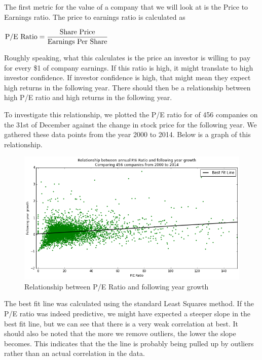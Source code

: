 \documentclass{report}
\begin{document}
The first metric for the value of a company that we will look at is the Price to Earnings ratio. The price to earnings ratio is calculated as

\begin{math}
  \\
	\text{P/E Ratio} = \dfrac{\text{Share Price}}{\text{Earnings Per Share}}
	\\
\end{math}

Roughly speaking, what this calculates is the price an investor is willing to pay for every \$1 of company earnings. If this ratio is high, it might translate to high investor confidence. If investor confidence is high, that might mean they expect high returns in the following year. There should then be a relationship between high P/E ratio and high returns in the following year.

To investigate this relationship, we plotted the P/E ratio for of 456 companies on the 31st of December against the change in stock price for the following year. We gathered these data points from the year 2000 to 2014. Below is a graph of this relationship.

\begin{figure}[H]
	\caption{Relationship between P/E Ratio and following year growth}
	\centerline{\includegraphics[width=\textwidth]{vis/pe-ratio-abs.png}}
	\label{fig:pe-abs}
\end{figure}

The best fit line was calculated using the standard Least Squares method. If the P/E ratio was indeed predictive, we might have expected a steeper slope in the best fit line, but we can see that there is a very weak correlation at best. It should also be noted that the more we remove outliers, the lower the slope becomes. This indicates that the the line is probably being pulled up by outliers rather than an actual correlation in the data. 
\end{document}
